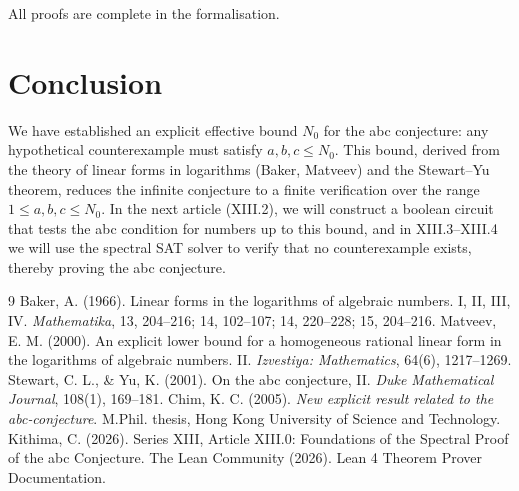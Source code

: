 \documentclass[11pt,a4paper]{article}
\begin{document}
All proofs are complete in the formalisation.

\section{Conclusion}

We have established an explicit effective bound \(N_0\) for the abc conjecture: any hypothetical counterexample must satisfy \(a,b,c \le N_0\). This bound, derived from the theory of linear forms in logarithms (Baker, Matveev) and the Stewart–Yu theorem, reduces the infinite conjecture to a finite verification over the range \(1 \le a,b,c \le N_0\). In the next article (XIII.2), we will construct a boolean circuit that tests the abc condition for numbers up to this bound, and in XIII.3–XIII.4 we will use the spectral SAT solver to verify that no counterexample exists, thereby proving the abc conjecture.


\begin{thebibliography}{9}
  Baker, A. (1966). Linear forms in the logarithms of algebraic numbers. I, II, III, IV. \emph{Mathematika}, 13, 204–216; 14, 102–107; 14, 220–228; 15, 204–216.
  Matveev, E. M. (2000). An explicit lower bound for a homogeneous rational linear form in the logarithms of algebraic numbers. II. \emph{Izvestiya: Mathematics}, 64(6), 1217–1269.
  Stewart, C. L., \& Yu, K. (2001). On the abc conjecture, II. \emph{Duke Mathematical Journal}, 108(1), 169–181.
  Chim, K. C. (2005). \emph{New explicit result related to the abc‑conjecture}. M.Phil. thesis, Hong Kong University of Science and Technology.
  Kithima, C. (2026). Series XIII, Article XIII.0: Foundations of the Spectral Proof of the abc Conjecture.
  The Lean Community (2026). Lean 4 Theorem Prover Documentation.
\end{thebibliography}
\end{document}
